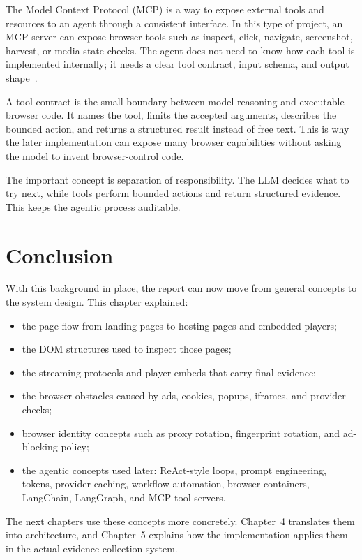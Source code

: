 The Model Context Protocol (MCP) is a way to expose external tools and resources to an
agent through a consistent interface. In this type of project, an MCP server can expose
browser tools such as inspect, click, navigate, screenshot, harvest, or media-state
checks. The agent does not need to know how each tool is implemented internally; it needs
a clear tool contract, input schema, and output shape~\cite{mcp-spec}.



A tool contract is the small boundary between model reasoning and executable browser
code. It names the tool, limits the accepted arguments, describes the bounded action,
and returns a structured result instead of free text. This is why the later
implementation can expose many browser capabilities without asking the model to invent
browser-control code.



The important concept is separation of responsibility. The LLM decides what to try next,
while tools perform bounded actions and return structured evidence. This keeps the
agentic process auditable.

\section{Conclusion}

With this background in place, the report can now move from general concepts to the
system design. This chapter explained:
\begin{itemize}
  \item the page flow from landing pages to hosting pages and embedded players;
  \item the DOM structures used to inspect those pages;
  \item the streaming protocols and player embeds that carry final evidence;
  \item the browser obstacles caused by ads, cookies, popups, iframes, and provider
  checks;
  \item browser identity concepts such as proxy rotation, fingerprint rotation, and
  ad-blocking policy;
  \item the agentic concepts used later: ReAct-style loops, prompt engineering,
  tokens, provider caching, workflow automation, browser
  containers, LangChain, LangGraph, and MCP tool servers.
\end{itemize}

The next chapters use these concepts more concretely. Chapter~4 translates them into
architecture, and Chapter~5 explains how the implementation applies them in the actual
evidence-collection system.
